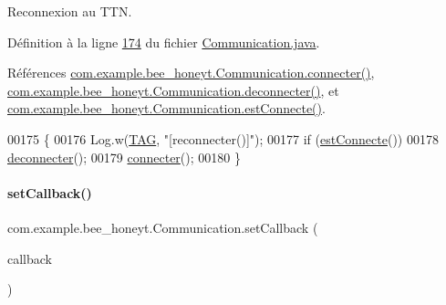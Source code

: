 Reconnexion au T\+TN. 



Définition à la ligne \hyperlink{_communication_8java_source_l00174}{174} du fichier \hyperlink{_communication_8java_source}{Communication.\+java}.



Références \hyperlink{_communication_8java_source_l00131}{com.\+example.\+bee\+\_\+honeyt.\+Communication.\+connecter()}, \hyperlink{_communication_8java_source_l00187}{com.\+example.\+bee\+\_\+honeyt.\+Communication.\+deconnecter()}, et \hyperlink{_communication_8java_source_l00219}{com.\+example.\+bee\+\_\+honeyt.\+Communication.\+est\+Connecte()}.


\begin{DoxyCode}
00175     \{
00176         Log.w(\hyperlink{classcom_1_1example_1_1bee__honeyt_1_1_communication_a848338dd9654af654c7e681742666785}{TAG}, \textcolor{stringliteral}{"[reconnecter()]"});
00177         \textcolor{keywordflow}{if} (\hyperlink{classcom_1_1example_1_1bee__honeyt_1_1_communication_a155e0619c3d504750871a84e637bb808}{estConnecte}())
00178             \hyperlink{classcom_1_1example_1_1bee__honeyt_1_1_communication_a55454851f5e883b1539bd60fa7f4bfc6}{deconnecter}();
00179         \hyperlink{classcom_1_1example_1_1bee__honeyt_1_1_communication_aadc176b28bce357bf655d0feec024013}{connecter}();
00180     \}
\end{DoxyCode}
\mbox{\label{classcom_1_1example_1_1bee__honeyt_1_1_communication_a86faf903d7d230a0105b29e5c1d5f4a2}} 
\paragraph{\texorpdfstring{set\+Callback()}{setCallback()}}
{\footnotesize\ttfamily com.\+example.\+bee\+\_\+honeyt.\+Communication.\+set\+Callback (\begin{DoxyParamCaption}\item[{Mqtt\+Callback\+Extended}]{callback }\end{DoxyParamCaption})\hspace{0.3cm}{\ttfamily [static]}}




